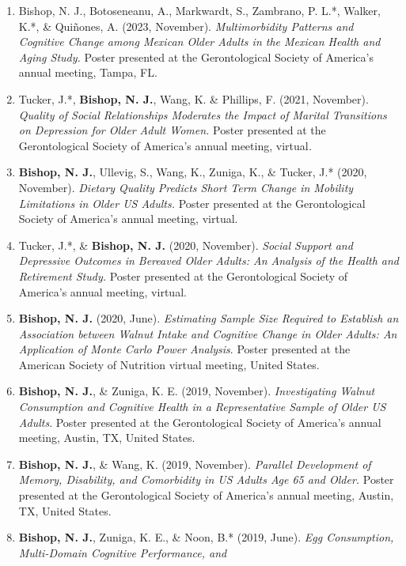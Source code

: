 \documentclass[
]{article}
\begin{document}
\begin{enumerate}
\def\labelenumi{\arabic{enumi}.}
\item
  Bishop, N. J., Botoseneanu, A., Markwardt, S., Zambrano, P. L.*,
  Walker, K.*, \& Quiñones, A. (2023, November). \emph{Multimorbidity
  Patterns and Cognitive Change among Mexican Older Adults in the
  Mexican Health and Aging Study.} Poster presented at the
  Gerontological Society of America's annual meeting, Tampa, FL.
\item
  Tucker, J.*, \textbf{Bishop, N. J.}, Wang, K. \& Phillips, F. (2021,
  November). \emph{Quality of Social Relationships Moderates the Impact
  of Marital Transitions on Depression for Older Adult Women.} Poster
  presented at the Gerontological Society of America's annual meeting,
  virtual\emph{.}
\item
  \textbf{Bishop, N. J.}, Ullevig, S., Wang, K., Zuniga, K., \& Tucker,
  J.* (2020, November). \emph{Dietary Quality Predicts Short Term Change
  in Mobility Limitations in Older US Adults.} Poster presented at the
  Gerontological Society of America's annual meeting, virtual.
\item
  Tucker, J.*, \& \textbf{Bishop, N. J.} (2020, November). \emph{Social
  Support and Depressive Outcomes in Bereaved Older Adults: An Analysis
  of the Health and Retirement Study.} Poster presented at the
  Gerontological Society of America's annual meeting, virtual.
\item
  \textbf{Bishop, N. J.} (2020, June). \emph{Estimating Sample Size
  Required to Establish an Association between Walnut Intake and
  Cognitive Change in Older Adults: An Application of Monte Carlo Power
  Analysis}. Poster presented at the American Society of Nutrition
  virtual meeting, United States.
\item
  \textbf{Bishop, N. J.}, \& Zuniga, K. E. (2019, November).
  \emph{Investigating Walnut Consumption and Cognitive Health in a
  Representative Sample of Older US Adults}. Poster presented at the
  Gerontological Society of America's annual meeting, Austin, TX, United
  States.
\item
  \textbf{Bishop, N. J.}, \& Wang, K. (2019, November). \emph{Parallel
  Development of Memory, Disability, and Comorbidity in US Adults Age 65
  and Older.} Poster presented at the Gerontological Society of
  America's annual meeting, Austin, TX, United States.
\item
  \textbf{Bishop, N. J.}, Zuniga, K. E., \& Noon, B.* (2019, June).
  \emph{Egg Consumption, Multi-Domain Cognitive Performance, and
}
\end{enumerate}
\end{document}
